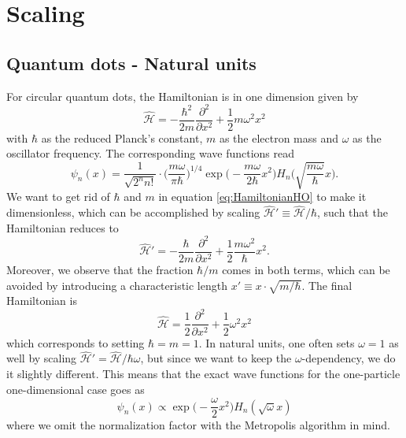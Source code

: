 \chapter{Scaling}

\section{Quantum dots - Natural units}
For circular quantum dots, the Hamiltonian is in one dimension given by
\begin{equation}
\hat{\mathcal{H}}=-\frac{\hbar^2}{2m}\frac{\partial^2}{\partial x^2}+\frac{1}{2}m\omega^2x^2
\label{eq:HamiltonianHO}
\end{equation}
with $\hbar$ as the reduced Planck's constant, $m$ as the electron mass and $\omega$ as the oscillator frequency. The corresponding wave functions read
\begin{equation}
\psi_n(x)=\frac{1}{\sqrt{2^nn!}}\cdot\bigg(\frac{m\omega}{\pi\hbar}\bigg)^{1/4}\exp\Big(-\frac{m\omega}{2\hbar}x^2\Big)H_n\Big(\sqrt{\frac{m\omega}{\hbar}}x\Big).
\end{equation}
We want to get rid of $\hbar$ and $m$ in equation \eqref{eq:HamiltonianHO} to make it dimensionless, which can be accomplished by scaling  $\hat{\mathcal{H}}'\equiv \hat{\mathcal{H}}/\hbar$, such that the Hamiltonian reduces to
\begin{equation}
\hat{\mathcal{H}}'=-\frac{\hbar}{2m}\frac{\partial^2}{\partial x^2}+\frac{1}{2}\frac{m\omega^2}{\hbar}x^2.
\end{equation}
Moreover, we observe that the fraction $\hbar/m$ comes in both terms, which can be avoided by introducing a characteristic length $x'\equiv x\cdot\sqrt{m/\hbar}$. The final Hamiltonian is
\begin{equation}
\hat{\mathcal{H}}=\frac{1}{2}\frac{\partial^2}{\partial x^2}+\frac{1}{2}\omega^2x^2
\end{equation}
which corresponds to setting $\hbar=m=1$. In natural units, one often sets $\omega=1$ as well by scaling $\hat{\mathcal{H}}'=\hat{\mathcal{H}}/\hbar\omega$, but since we want to keep the $\omega$-dependency, we do it slightly different. This means that the exact wave functions for the one-particle one-dimensional case goes as
\begin{equation}
\psi_n(x)\propto\exp\Big(-\frac{\omega}{2}x^2\Big)H_n(\sqrt{\omega}x)
\end{equation}
where we omit the normalization factor with the Metropolis algorithm in mind. 

